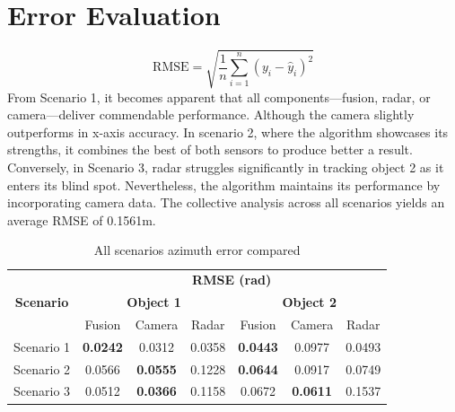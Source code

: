 \section{Error Evaluation}\label{sec:3-evaluation}
\begin{equation}\label{equ:4_RMSE}
\text{RMSE} = \sqrt{\frac{1}{n}\sum_{i=1}^{n}(y_i - \hat{y}_i)^2}
\end{equation}
From Scenario 1, it becomes apparent that all components—fusion, radar, 
or camera—deliver commendable performance. 
Although the camera slightly outperforms in x-axis accuracy. 
In scenario 2, where the algorithm showcases its strengths, 
it combines the best of both sensors to produce better a result.
Conversely, in Scenario 3, radar struggles significantly in tracking object 2 as it enters its blind spot. 
Nevertheless, the algorithm maintains its performance by incorporating camera data. 
The collective analysis across all scenarios yields an average RMSE of 0.1561m.
\begin{table}[h!]
    \begin{center}
      \label{tab:table2}
      \begin{tabular}{c|c|c|c|c|c|c} %
        \multirow{3}{*}{\textbf{Scenario}} & \multicolumn{6}{c}{\textbf{RMSE (rad)}}\\\cline{2-7}
                                            & \multicolumn{3}{c|}{\textbf{Object 1}}  & \multicolumn{3}{c}{\textbf{Object 2}}\\
        \cline{2-7}
                   & Fusion & Camera & Radar & Fusion & Camera & Radar \\
        \hline
        Scenario 1 & \textbf{0.0242} & 0.0312 & 0.0358 & \textbf{0.0443}  & 0.0977 & 0.0493 \\
        Scenario 2 & 0.0566 & \textbf{0.0555} & 0.1228 & \textbf{0.0644} & 0.0917 & 0.0749 \\
        Scenario 3 & 0.0512 & \textbf{0.0366} & 0.1158 & 0.0672 & \textbf{0.0611} & 0.1537 \\
      \end{tabular}
    \end{center}
    \caption{All scenarios azimuth error compared}
    \label{tab:scenarios_rmse}
  \end{table}

  


